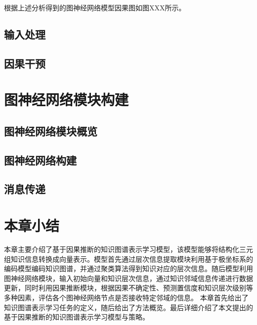 \documentclass[algorithmlist, AutoFakeBold, AutoFakeSlant, figurelist, tablelist, nomlist, masters]{seuthesix}
\begin{document}
根据上述分析得到的图神经网络模型因果图如图XXX所示。

\subsection{输入处理}


\subsection{因果干预}


\section{图神经网络模块构建}


\subsection{图神经网络模块概览}


\subsection{图神经网络构建}


\subsection{消息传递}


\section{本章小结}
本章主要介绍了基于因果推断的知识图谱表示学习模型，该模型能够将结构化三元组知识信息转换成向量表示。模型首先通过层次信息提取模块利用基于极坐标系的编码模型编码知识图谱，并通过聚类算法得到知识对应的层次信息。随后模型利用图神经网络模块，输入初始向量和知识层次信息，通过知识邻域信息传递进行数据更新，同时利用因果推断模块，根据因果不确定性、预测置信度和知识层次级别等多种因素，评估各个图神经网络节点是否接收特定邻域的信息。
本章首先给出了知识图谱表示学习任务的定义，随后给出了方法概览。最后详细介绍了本文提出的基于因果推断的知识图谱表示学习模型与策略。
\end{document}
